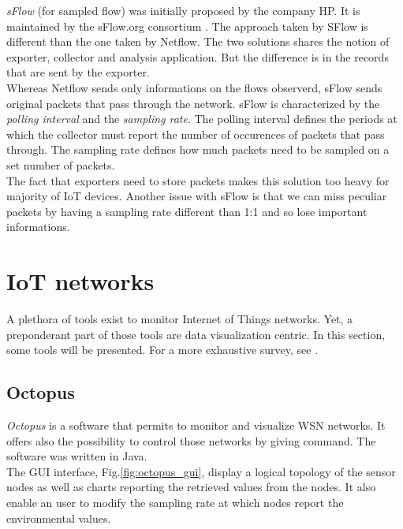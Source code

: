 \textit{sFlow} (for sampled flow) was initially proposed by the company HP. It is maintained by the sFlow.org consortium \cite{website:sflow}. The approach taken by SFlow is different than the one taken by Netflow. The two solutions shares the notion of exporter, collector and analysis application. But the difference is in the records that are sent by the exporter. \\

Whereas Netflow sends only informations on the flows observerd, sFlow sends original packets that pass through the network. sFlow is characterized by the \textit{polling interval} and the \textit{sampling rate}. The polling interval defines the periods at which the collector must report the number of occurences of packets that pass through. The sampling rate defines how much packets need to be sampled on a set number of packets. \\

The fact that exporters need to store packets makes this solution too heavy for majority of IoT devices. Another issue with sFlow is that we can miss peculiar packets by having a sampling rate different than 1:1 and so lose important informations.

\section{IoT networks}

A plethora of tools exist to monitor Internet of Things networks. Yet, a preponderant part of those tools are data visualization centric. In this section, some tools will be presented. For a more exhaustive survey, see \cite{parbat2010data}.

\subsection{Octopus}

\textit{Octopus} \cite{jurdak2011octopus} is a software that permits to monitor and visualize WSN networks. It offers also the possibility to control those networks by giving command. The software was written in Java. \\

The GUI interface, Fig.\ref{fig:octopus_gui}, display a logical topology of the sensor nodes as well as charts reporting the retrieved values from the nodes. It also enable an user to modify the sampling rate at which nodes report the environmental values. \\

